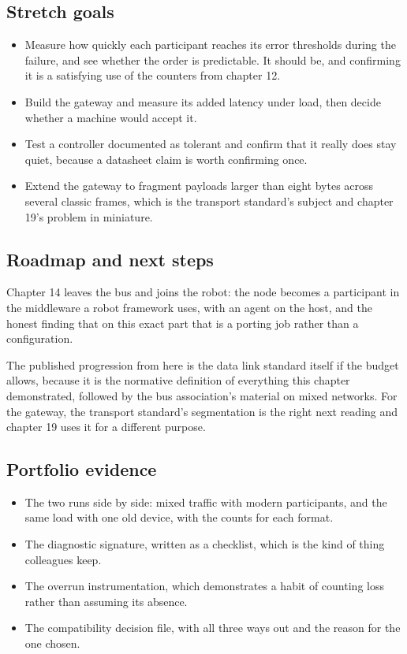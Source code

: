 \subsection*{Stretch goals}

\begin{itemize}
\item Measure how quickly each participant reaches its error thresholds during
the failure, and see whether the order is predictable. It should be, and
confirming it is a satisfying use of the counters from chapter 12.
\item Build the gateway and measure its added latency under load, then decide
whether a machine would accept it.
\item Test a controller documented as tolerant and confirm that it really does
stay quiet, because a datasheet claim is worth confirming once.
\item Extend the gateway to fragment payloads larger than eight bytes across
several classic frames, which is the transport standard's subject and chapter
19's problem in miniature.
\end{itemize}

\subsection*{Roadmap and next steps}

Chapter 14 leaves the bus and joins the robot: the node becomes a participant in
the middleware a robot framework uses, with an agent on the host, and the
honest finding that on this exact part that is a porting job rather than a
configuration.

The published progression from here is the data link standard itself if the
budget allows, because it is the normative definition of everything this chapter
demonstrated, followed by the bus association's material on mixed networks. For
the gateway, the transport standard's segmentation is the right next reading and
chapter 19 uses it for a different purpose.

\subsection*{Portfolio evidence}

\begin{itemize}
\item The two runs side by side: mixed traffic with modern participants, and the
same load with one old device, with the counts for each format.
\item The diagnostic signature, written as a checklist, which is the kind of
thing colleagues keep.
\item The overrun instrumentation, which demonstrates a habit of counting loss
rather than assuming its absence.
\item The compatibility decision file, with all three ways out and the reason
for the one chosen.
\end{itemize}

